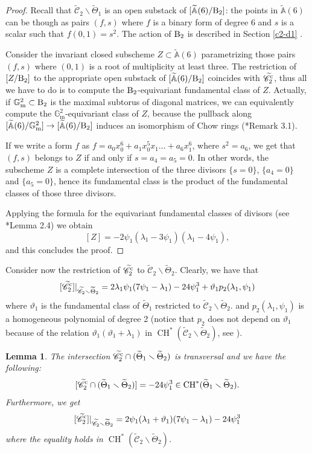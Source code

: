 \documentclass[a4paper, 10pt]{amsart}
\numberwithin{equation}{section}
\numberwithin{subsection}{section}
\newtheorem{lemma}[theorem]{Lemma}
\theoremstyle{definition}
\theoremstyle{remark}
\renewcommand{\mathcal}{\mathscr}
\renewcommand\AA{\mathbb{A}} \newcommand\BB{\mathbb{B}}
\newcommand\GG{\mathbb{G}} \newcommand\HH{\mathbb{H}}
\newcommand\rmm{\mathrm{m}} \newcommand\rmn{\mathrm{n}}
\newcommand\arr{\ifinner\to\else\longrightarrow\fi}
\renewcommand{\setminus}{\smallsetminus}
\newcommand{\gm}{\GG_{\rmm}}
\newcommand{\Ctilde}{\widetilde{\mathcal C}}
\newcommand{\ThTilde}{\widetilde{\Theta}}
\newcommand{\ch}[1][*]{\operatorname{CH}^{#1}}
\begin{document}
	\begin{proof}
		Recall that $\Ctilde_2 \setminus \ThTilde_1$ is an open substack of $[\widetilde{\AA}(6)/\rm B_2]$: the points in $\widetilde{\AA}(6)$ can be though as pairs $(f,s)$ where $f$ is a binary form of degree $6$ and $s$ is a scalar such that $f(0,1)=s^2$. The action of $\rm B_2$ is described in Section \ref{c2-d1} .
		
		Consider the invariant closed subscheme $Z \subset \widetilde{\AA}(6)$ parametrizing those pairs $(f,s)$ where $(0,1)$ is a root of multiplicity at least three. The restriction of $[Z/\rm B_2]$ to the appropriate open substack of $[\widetilde{\AA}(6)/\rm B_2]$ coincides with $\Ctilde_2^{\rm c}$, thus all we have to do is to compute the $\rm B_2$-equivariant fundamental class of $Z$. Actually, if $\gm^2\subset \rm B_2$ is the maximal subtorus of diagonal matrices, we can equivalently compute the $\gm^2$-equivariant class of $Z$, because the pullback along $[\widetilde{\AA}(6)/\gm^2]\arr[\widetilde{\AA}(6)/\rm B_2]$ induces an isomorphism of Chow rings (\cite{Per}*{Remark 3.1}).
		
		If we write a form $f$ as $f=a_0x_0^6+a_1x_0^5x_1...+a_6x_1^6$, where $s^2=a_6$, we get that $(f,s)$ belongs to $Z$ if and only if $s=a_4=a_5=0$. In other words, the subscheme $Z$ is a complete intersection of the three divisors $\{s=0\}$, $\{a_4=0\}$ and $\{ a_5=0\}$, hence its fundamental class is the product of the fundamental classes of those three divisors. 
		
		Applying the formula for the equivariant fundamental classes of divisors (see \cite{EF}*{Lemma 2.4}) we obtain
		$$ [Z]=-2\psi_1(\lambda_1-3\psi_1)(\lambda_1-4\psi_1),$$
		and this concludes the proof.
	\end{proof}
	
	Consider now the restriction of $\Ctilde^{\rm c}_2$ to $\Ctilde_2 \setminus \ThTilde_2$. Clearly, we have that 
	$$ [\Ctilde_2^{\rm c}]\vert_{\Ctilde_2 \setminus \ThTilde_2}=2\lambda_1\psi_1(7\psi_1-\lambda_1) - 24 \psi_1^3 + \vartheta_1p_2(\lambda_1,\psi_1) $$ 
	where $\vartheta_1$ is the fundamental class of $\ThTilde_1$ restricted to $\Ctilde_2 \setminus \ThTilde_2$.
	and $p_2(\lambda_1,\psi_1)$ is a homogeneous polynomial of degree 2 (notice that $p_2$ does not depend on $\vartheta_1$ because of the relation $\vartheta_1(\vartheta_1+\lambda_1)$ in $\ch(\Ctilde_2 \setminus \ThTilde_2)$, see ).
	
	\begin{lemma}\label{lm:cusp in Ctilde2 minus ThTilde2}
		The intersection $\Ctilde_2^{\rm c} \cap (\ThTilde_1 \setminus \ThTilde_2)$ is transversal and we have the following:
		$$[\Ctilde_2^{\rm c} \cap (\ThTilde_1 \setminus \ThTilde_2)] = -24 \psi_1^3 \in \ch(\ThTilde_1 \setminus \ThTilde_2). $$
		Furthermore, we get 
		$$[\Ctilde_2^{\rm c}]\vert_{\Ctilde_2 \setminus \ThTilde_2}=2\psi_1(\lambda_1+\vartheta_1)(7\psi_1-\lambda_1) - 24 \psi_1^3$$ 
		where the equality holds in $\ch(\Ctilde_2 \setminus \ThTilde_2)$.
	\end{lemma}
	
\end{document}
